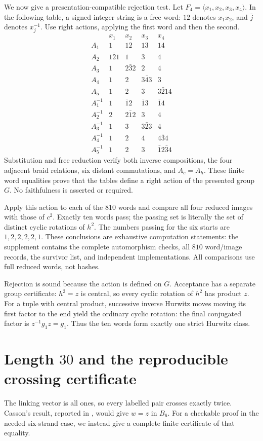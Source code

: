 \documentclass[11pt]{article}
\newcommand{\B}{B_6}
\begin{document}
We now give a presentation-compatible rejection test.
Let \(F_4=\langle x_1,x_2,x_3,x_4\rangle\).
In the following table, a signed integer string is a free word:
\(12\) denotes \(x_1x_2\), and \(\bar j\) denotes \(x_j^{-1}\).
Use right actions, applying the first word and then the second.
\[
\begin{array}{c|cccc}
 &x_1&x_2&x_3&x_4\\\hline
A_1&1&12&13&14\\
A_2&1\bar2 1&1&3&4\\
A_3&1&2\bar3 2&2&4\\
A_4&1&2&3\bar4 3&3\\
A_5&1&2&3&3\bar2 14\\\hline
A_1^{-1}&1&\bar1 2&\bar1 3&\bar1 4\\
A_2^{-1}&2&2\bar1 2&3&4\\
A_3^{-1}&1&3&3\bar2 3&4\\
A_4^{-1}&1&2&4&4\bar3 4\\
A_5^{-1}&1&2&3&\bar1 2\bar3 4
\end{array}
\]
Substitution and free reduction verify both inverse compositions,
the four adjacent braid relations, six distant commutations,
and \(A_c=A_h\). These finite word equalities prove that the
tables define a right action of the presented group \(G\).
No faithfulness is asserted or required.

Apply this action to each of the \(810\) words and compare all
four reduced images with those of \(c^2\).
Exactly ten words pass; the passing set is literally the set of
distinct cyclic rotations of \(h^2\).
The numbers passing for the six starts are \(1,2,2,2,2,1\).
These conclusions are exhaustive computation statements:
the supplement contains the complete automorphism checks,
all \(810\) word/image records, the survivor list, and independent
implementations. All comparisons use full reduced words, not hashes.

Rejection is sound because the action is defined on \(G\).
Acceptance has a separate group certificate: \(h^2=z\) is central,
so every cyclic rotation of \(h^2\) has product \(z\).
For a tuple with central product, successive inverse Hurwitz moves
moving its first factor to the end yield the ordinary cyclic rotation:
the final conjugated factor is \(z^{-1}g_1z=g_1\).
Thus the ten words form exactly one strict Hurwitz class.

\section{Length \texorpdfstring{\(30\)}{30} and the reproducible crossing certificate}
The linking vector is all ones, so every labelled pair crosses
exactly twice. Casson's result, reported in \cite[p.~496]{EM},
would give \(w=z\) in \(\B\).
For a checkable proof in the needed six-strand case, we instead
give a complete finite certificate of that equality.
\end{document}
